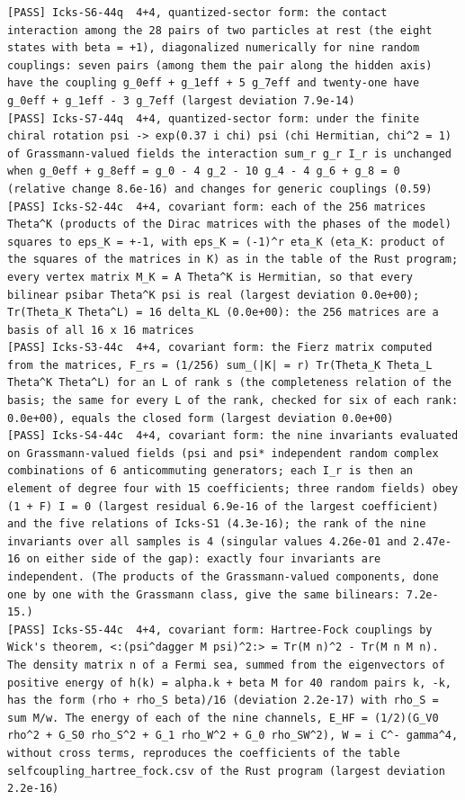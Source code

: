 \documentclass[
  10pt,
]{article}
\begin{document}
\begin{verbatim}
[PASS] Icks-S6-44q  4+4, quantized-sector form: the contact interaction among the 28 pairs of two particles at rest (the eight states with beta = +1), diagonalized numerically for nine random couplings: seven pairs (among them the pair along the hidden axis) have the coupling g_0eff + g_1eff + 5 g_7eff and twenty-one have g_0eff + g_1eff - 3 g_7eff (largest deviation 7.9e-14)
[PASS] Icks-S7-44q  4+4, quantized-sector form: under the finite chiral rotation psi -> exp(0.37 i chi) psi (chi Hermitian, chi^2 = 1) of Grassmann-valued fields the interaction sum_r g_r I_r is unchanged when g_0eff + g_8eff = g_0 - 4 g_2 - 10 g_4 - 4 g_6 + g_8 = 0 (relative change 8.6e-16) and changes for generic couplings (0.59)
[PASS] Icks-S2-44c  4+4, covariant form: each of the 256 matrices Theta^K (products of the Dirac matrices with the phases of the model) squares to eps_K = +-1, with eps_K = (-1)^r eta_K (eta_K: product of the squares of the matrices in K) as in the table of the Rust program; every vertex matrix M_K = A Theta^K is Hermitian, so that every bilinear psibar Theta^K psi is real (largest deviation 0.0e+00); Tr(Theta_K Theta^L) = 16 delta_KL (0.0e+00): the 256 matrices are a basis of all 16 x 16 matrices
[PASS] Icks-S3-44c  4+4, covariant form: the Fierz matrix computed from the matrices, F_rs = (1/256) sum_(|K| = r) Tr(Theta_K Theta_L Theta^K Theta^L) for an L of rank s (the completeness relation of the basis; the same for every L of the rank, checked for six of each rank: 0.0e+00), equals the closed form (largest deviation 0.0e+00)
[PASS] Icks-S4-44c  4+4, covariant form: the nine invariants evaluated on Grassmann-valued fields (psi and psi* independent random complex combinations of 6 anticommuting generators; each I_r is then an element of degree four with 15 coefficients; three random fields) obey (1 + F) I = 0 (largest residual 6.9e-16 of the largest coefficient) and the five relations of Icks-S1 (4.3e-16); the rank of the nine invariants over all samples is 4 (singular values 4.26e-01 and 2.47e-16 on either side of the gap): exactly four invariants are independent. (The products of the Grassmann-valued components, done one by one with the Grassmann class, give the same bilinears: 7.2e-15.)
[PASS] Icks-S5-44c  4+4, covariant form: Hartree-Fock couplings by Wick's theorem, <:(psi^dagger M psi)^2:> = Tr(M n)^2 - Tr(M n M n). The density matrix n of a Fermi sea, summed from the eigenvectors of positive energy of h(k) = alpha.k + beta M for 40 random pairs k, -k, has the form (rho + rho_S beta)/16 (deviation 2.2e-17) with rho_S = sum M/w. The energy of each of the nine channels, E_HF = (1/2)(G_V0 rho^2 + G_S0 rho_S^2 + G_1 rho_W^2 + G_0 rho_SW^2), W = i C^- gamma^4, without cross terms, reproduces the coefficients of the table selfcoupling_hartree_fock.csv of the Rust program (largest deviation 2.2e-16)

\end{verbatim}
\end{document}
